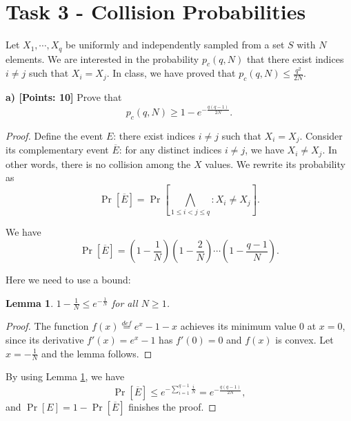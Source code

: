 \documentclass[12pt]{article}
\newcommand{\eqdef}{\stackrel{def}{=}}
\newtheorem{lemma}[theorem]{Lemma}
\theoremstyle{definition}
\begin{document}
\section{Task 3 - Collision Probabilities}
Let $X_1, \cdots, X_q$ be uniformly and independently sampled from a set $S$ with $N$ elements. We are interested in the probability $p_c(q, N)$ that there exist indices $i \not = j$ such that $X_i = X_j$. In class, we have proved that $p_c(q, N) \leq \frac{q^2}{2N}$.

{\bf a) [Points: 10]} Prove that
$$p_c(q, N) \geq 1-e^{-\frac{q(q-1)}{2N}}.$$
\begin{proof}
Define the event $E$: there exist indices $i \not = j$ such that $X_i = X_j$. 
Consider its complementary event $\overline{E}$: for any distinct indices $i \not= j$, we have $X_i \not= X_j$. In other words, there is no collision among the $X$ values. We rewrite its probability as
$$\Pr[\overline{E}] = \Pr[\bigwedge_{1\leq i < j \leq q} : X_i \not = X_j].$$

We have
$$\Pr[\overline{E}] = (1-\frac{1}{N})(1-\frac{2}{N})\cdots(1-\frac{q-1}{N}).$$

Here we need to use a bound:
\begin{lemma}
\label{lem:1}
$1-\frac{1}{N} \leq e^{-\frac{1}{N}}$ for all $N\geq 1$.
\end{lemma}
\begin{proof}
The function $f(x) \eqdef e^x-1-x$ achieves its minimum value 0 at $x=0$, since its derivative $f'(x) = e^x-1$ has $f'(0)=0$ and $f(x)$ is convex. Let $x=-\frac{1}{N}$ and the lemma follows.
\end{proof}
By using Lemma \ref{lem:1}, we have
$$\Pr[\overline{E}] \leq e^{-\sum_{i=1}^{q-1}\frac{i}{N}} = e^{-\frac{q(q-1)}{2N}},$$
and $\Pr[E] = 1-\Pr[\overline{E}]$ finishes the proof.
\end{proof}
\end{document}
